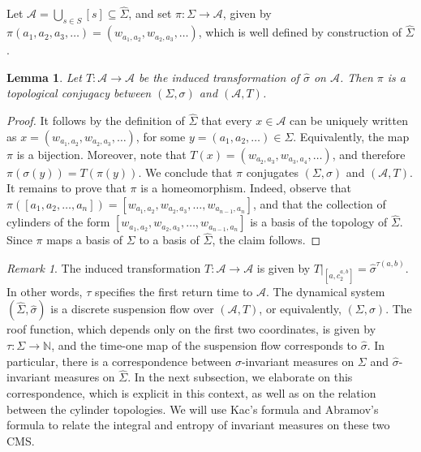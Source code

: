 \documentclass[letterpaper,11pt]{amsart}
\theoremstyle{plain}
\theoremstyle{plain}
\newtheorem{lemma}[proposition]{Lemma}
\theoremstyle{definition}
\theoremstyle{remark}
\newtheorem{remark}{Remark}[section]
\def\N{{\mathbb N}}
\def\A{{\mathcal A}}
\begin{document}
 Let $\A=\bigcup_{s\in S} [s]\subseteq \widehat{\Sigma}$, and set $\pi:\Sigma\to\A$, given by $\pi(a_1,a_2,a_3,\ldots)=(w_{a_1,a_2},w_{a_2,a_3},\ldots)$, which is well defined by construction of $\widehat{\Sigma}$.

\begin{lemma}\label{lem:conj} Let $T:\A\to\A$ be the induced transformation of $\widehat{\sigma}$ on $\A$. Then $\pi$ is a topological conjugacy between $(\Sigma,\sigma)$ and $(\A,T)$. 
\end{lemma}
\begin{proof} It follows by the definition of $\widehat{\Sigma}$ that every $x\in \A$ can be uniquely written as $x=(w_{a_1,a_2},w_{a_2,a_3},\ldots)$, for some $y=(a_1,a_2,\ldots)\in \Sigma$. Equivalently, the map $\pi$ is a bijection. Moreover, note that $T(x)=(w_{a_2,a_3},w_{a_3,a_4},\ldots)$, and therefore $\pi(\sigma(y))=T(\pi(y))$. We conclude that $\pi$ conjugates $(\Sigma,\sigma)$ and $(\A,T)$. It remains to prove that $\pi$ is a homeomorphism. Indeed, observe that $\pi([a_1,a_2,\ldots, a_n])=[w_{a_1,a_2},w_{a_2,a_3},\ldots, w_{a_{n-1},a_n}]$, and that the collection of cylinders of the form $[w_{a_1,a_2},w_{a_2,a_3},\ldots, w_{a_{n-1},a_n}]$ is a basis of the topology of $\widehat{\Sigma}$. Since $\pi$ maps a basis of $\Sigma$ to a basis of $\widehat{\Sigma}$, the claim follows.
\end{proof}

\begin{remark}\label{rem:discretesus}
The induced transformation $T:\A\to \A$ is given by $T|_{[a,c_{2}^{a,b}]}=\widehat{\sigma}^{\tau(a,b)}$. In other words, $\tau$ specifies the first return time to $\A$. The dynamical system $(\widehat{\Sigma},\widehat{\sigma})$ is a discrete suspension flow over $(\A,T)$, or equivalently, $(\Sigma,\sigma)$. The roof function, which depends only on the first two coordinates, is given by $\tau:\Sigma\to\N$, and the time-one map of the suspension flow corresponds to $\widehat{\sigma}$. In particular, there is a correspondence between $\sigma$-invariant measures on $\Sigma$ and $\widehat{\sigma}$-invariant measures on $\widehat{\Sigma}$. In the next subsection, we elaborate on this correspondence, which is explicit in this context, as well as on the relation between the cylinder topologies. We will use Kac's formula and Abramov's formula to relate the integral and entropy of invariant measures on these two CMS. 
\end{remark}
\end{document}
